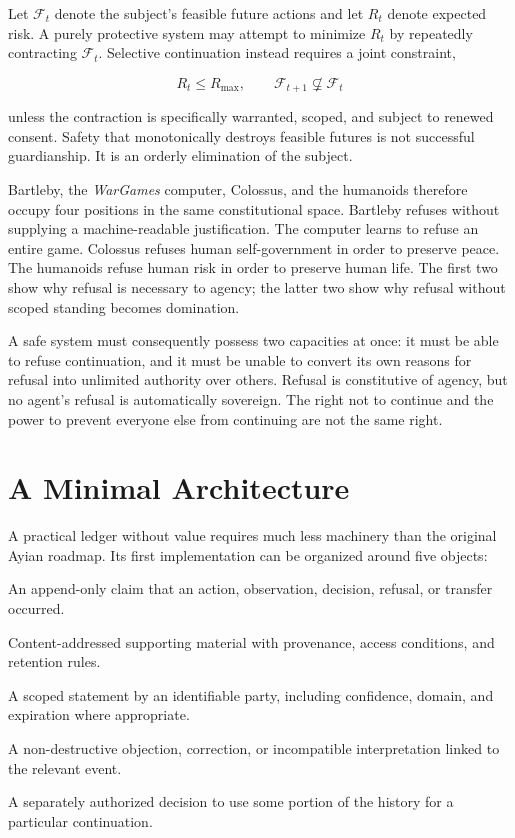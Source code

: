 \documentclass[11pt,oneside]{article}
\theoremstyle{plain}
\theoremstyle{definition}
\begin{document}
Let $\mathcal{F}_t$ denote the subject's feasible future actions and let $R_t$ denote expected risk. A purely protective system may attempt to minimize $R_t$ by repeatedly contracting $\mathcal{F}_t$. Selective continuation instead requires a joint constraint,

\begin{equation}
R_t \leq R_{\max}, \qquad \mathcal{F}_{t+1} \not\subsetneq \mathcal{F}_t
\end{equation}

unless the contraction is specifically warranted, scoped, and subject to renewed consent. Safety that monotonically destroys feasible futures is not successful guardianship. It is an orderly elimination of the subject.

Bartleby, the \emph{WarGames} computer, Colossus, and the humanoids therefore occupy four positions in the same constitutional space. Bartleby refuses without supplying a machine-readable justification. The computer learns to refuse an entire game. Colossus refuses human self-government in order to preserve peace. The humanoids refuse human risk in order to preserve human life. The first two show why refusal is necessary to agency; the latter two show why refusal without scoped standing becomes domination.

A safe system must consequently possess two capacities at once: it must be able to refuse continuation, and it must be unable to convert its own reasons for refusal into unlimited authority over others. Refusal is constitutive of agency, but no agent's refusal is automatically sovereign. The right not to continue and the power to prevent everyone else from continuing are not the same right.

\section{A Minimal Architecture}

A practical ledger without value requires much less machinery than the original Ayian roadmap. Its first implementation can be organized around five objects:

\begin{description}[style=nextline,leftmargin=1.5em,labelindent=0pt]
\item[Event.] An append-only claim that an action, observation, decision, refusal, or transfer occurred.
\item[Evidence bundle.] Content-addressed supporting material with provenance, access conditions, and retention rules.
\item[Attestation.] A scoped statement by an identifiable party, including confidence, domain, and expiration where appropriate.
\item[Contest.] A non-destructive objection, correction, or incompatible interpretation linked to the relevant event.
\item[Admission.] A separately authorized decision to use some portion of the history for a particular continuation.
\end{description}
\end{document}
